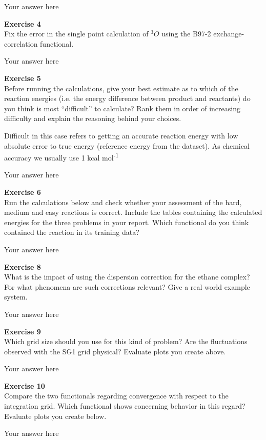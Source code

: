 \documentclass{article}
\begin{document}
Your answer here

\begin{mdframed}
\textbf{Exercise 4}\\
Fix the error in the single point calculation of  $^3 O$ using the B97-2 exchange-correlation functional.
\end{mdframed}

Your answer here

\begin{mdframed}
\textbf{Exercise 5}\\
Before running the calculations, give your best estimate as to which of the reaction energies (i.e. the energy difference between product and reactants) do you think is most ``difficult'' to calculate? Rank them in order of increasing difficulty and explain the reasoning behind your choices.

Difficult in this case refers to getting an accurate reaction energy with low absolute error to true energy (reference energy from the dataset). As chemical accuracy we usually use 1 kcal mol\textsuperscript{-1}
\end{mdframed}

Your answer here

\begin{mdframed}
\textbf{Exercise 6}\\
Run the calculations below and check whether your assessment of the hard, medium and easy reactions is correct. Include the tables containing the calculated energies for the three problems in your report. Which functional do you think contained the reaction in its training data?
\end{mdframed}

Your answer here

\begin{mdframed}
\textbf{Exercise 8}\\
What is the impact of using the dispersion correction for the ethane complex? For what phenomena are such corrections relevant? Give a real world example system.
\end{mdframed}

Your answer here

\begin{mdframed}
\textbf{Exercise 9}\\
Which grid size should you use for this kind of problem? Are the fluctuations observed with the SG1 grid physical? Evaluate plots you create above.
\end{mdframed}

Your answer here

\begin{mdframed}
\textbf{Exercise 10}\\
Compare the two functionals regarding convergence with respect to the integration grid. Which functional shows concerning behavior in this regard? Evaluate plots you create below.
\end{mdframed}

Your answer here
\end{document}
